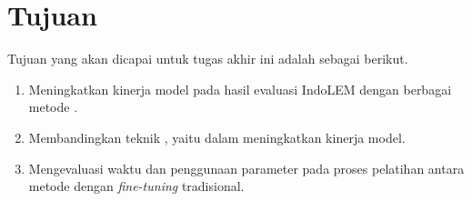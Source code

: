 \section{Tujuan}

Tujuan yang akan dicapai untuk tugas akhir ini adalah sebagai berikut.

\begin{enumerate}
    \item Meningkatkan kinerja model pada hasil evaluasi IndoLEM dengan berbagai metode \PETL.
    \item Membandingkan teknik \PETL, yaitu \methodPETL dalam meningkatkan kinerja model.
    \item Mengevaluasi waktu dan penggunaan parameter pada proses pelatihan antara metode \PETL dengan \textit{fine-tuning} tradisional.
\end{enumerate}
